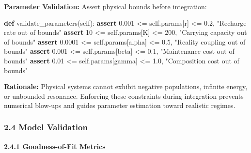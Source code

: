 \documentclass[
]{article}
\newenvironment{Shaded}{}{}
\newcommand{\ControlFlowTok}[1]{\textcolor[rgb]{0.00,0.44,0.13}{\textbf{#1}}}
\newcommand{\DecValTok}[1]{\textcolor[rgb]{0.25,0.63,0.44}{#1}}
\newcommand{\FloatTok}[1]{\textcolor[rgb]{0.25,0.63,0.44}{#1}}
\newcommand{\KeywordTok}[1]{\textcolor[rgb]{0.00,0.44,0.13}{\textbf{#1}}}
\newcommand{\NormalTok}[1]{#1}
\newcommand{\OperatorTok}[1]{\textcolor[rgb]{0.40,0.40,0.40}{#1}}
\newcommand{\StringTok}[1]{\textcolor[rgb]{0.25,0.44,0.63}{#1}}
\newcommand{\VariableTok}[1]{\textcolor[rgb]{0.10,0.09,0.49}{#1}}
\begin{document}
\textbf{Parameter Validation:} Assert physical bounds before
integration:

\begin{Shaded}
\begin{Highlighting}[]
\KeywordTok{def}\NormalTok{ validate\_parameters(}\VariableTok{self}\NormalTok{):}
    \ControlFlowTok{assert} \FloatTok{0.001} \OperatorTok{\textless{}=} \VariableTok{self}\NormalTok{.params[}\StringTok{\textquotesingle{}r\textquotesingle{}}\NormalTok{] }\OperatorTok{\textless{}=} \FloatTok{0.2}\NormalTok{, }\StringTok{"Recharge rate out of bounds"}
    \ControlFlowTok{assert} \DecValTok{10} \OperatorTok{\textless{}=} \VariableTok{self}\NormalTok{.params[}\StringTok{\textquotesingle{}K\textquotesingle{}}\NormalTok{] }\OperatorTok{\textless{}=} \DecValTok{200}\NormalTok{, }\StringTok{"Carrying capacity out of bounds"}
    \ControlFlowTok{assert} \FloatTok{0.0001} \OperatorTok{\textless{}=} \VariableTok{self}\NormalTok{.params[}\StringTok{\textquotesingle{}alpha\textquotesingle{}}\NormalTok{] }\OperatorTok{\textless{}=} \FloatTok{0.5}\NormalTok{, }\StringTok{"Reality coupling out of bounds"}
    \ControlFlowTok{assert} \FloatTok{0.001} \OperatorTok{\textless{}=} \VariableTok{self}\NormalTok{.params[}\StringTok{\textquotesingle{}beta\textquotesingle{}}\NormalTok{] }\OperatorTok{\textless{}=} \FloatTok{0.1}\NormalTok{, }\StringTok{"Maintenance cost out of bounds"}
    \ControlFlowTok{assert} \FloatTok{0.01} \OperatorTok{\textless{}=} \VariableTok{self}\NormalTok{.params[}\StringTok{\textquotesingle{}gamma\textquotesingle{}}\NormalTok{] }\OperatorTok{\textless{}=} \FloatTok{1.0}\NormalTok{, }\StringTok{"Composition cost out of bounds"}
\end{Highlighting}
\end{Shaded}

\textbf{Rationale:} Physical systems cannot exhibit negative
populations, infinite energy, or unbounded resonance. Enforcing these
constraints during integration prevents numerical blow-ups and guides
parameter estimation toward realistic regimes.

\subsubsection{2.4 Model Validation}\label{model-validation}

\paragraph{2.4.1 Goodness-of-Fit Metrics}\label{goodness-of-fit-metrics}
\end{document}
